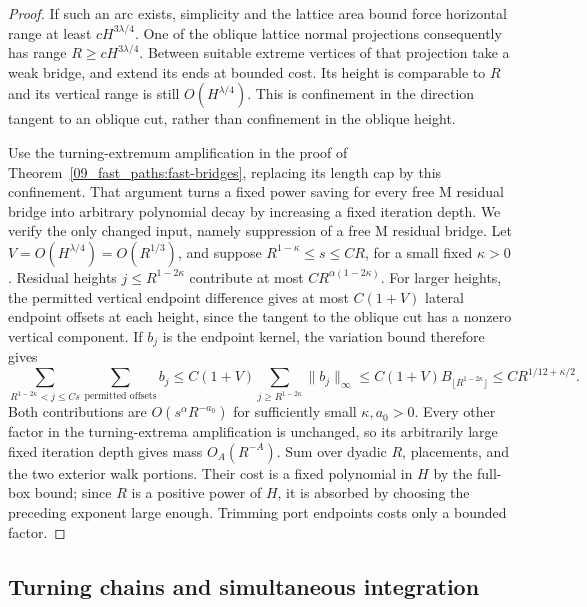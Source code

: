 \begin{proof}
If such an arc exists, simplicity and the lattice area bound force
horizontal range at least $cH^{3\lambda/4}$. One of the oblique lattice
normal projections consequently has range
$R\ge cH^{3\lambda/4}$. Between suitable extreme vertices of that
projection take a weak bridge, and extend its ends at bounded cost.
Its height is comparable to $R$ and its vertical range is still
$O(H^{\lambda/4})$. This is confinement in the direction tangent to
an oblique cut, rather than confinement in the oblique height.

Use the turning-extremum amplification in the proof of
Theorem~\ref{09_fast_paths:fast-bridges}, replacing its length cap
by this confinement. That argument turns a fixed power saving for
every free $\mathrm M$ residual bridge into arbitrary polynomial decay
by increasing a fixed iteration depth. We verify the only changed input, namely suppression of a
free $\mathrm M$ residual bridge. Let $V=O(H^{\lambda/4})=O(R^{1/3})$,
and suppose $R^{1-\kappa}\le s\le CR$, for a small fixed $\kappa>0$.
Residual heights $j\le R^{1-2\kappa}$ contribute at most
$CR^{\alpha(1-2\kappa)}$. For larger heights, the permitted vertical
endpoint difference gives at most $C(1+V)$ lateral endpoint offsets
at each height, since the tangent to the oblique cut has a nonzero
vertical component. If $b_j$ is the endpoint kernel, the variation
bound therefore gives
\[
 \sum_{R^{1-2\kappa}<j\le Cs}
       \sum_{\text{permitted offsets}}b_j
 \le C(1+V)\sum_{j\ge R^{1-2\kappa}}\|b_j\|_\infty
 \le C(1+V)B_{\lfloor R^{1-2\kappa}\rfloor}
 \le C R^{1/12+\kappa/2}.
\]
Both contributions are $O(s^\alpha R^{-a_0})$ for sufficiently small
$\kappa,a_0>0$. Every other factor in the turning-extrema amplification
is unchanged, so its arbitrarily large fixed iteration depth gives
mass $O_A(R^{-A})$. Sum over dyadic $R$, placements, and the two exterior
walk portions. Their cost is a fixed polynomial in $H$ by the full-box
bound; since $R$ is a positive power of $H$, it is absorbed by choosing
the preceding exponent large enough. Trimming port endpoints costs
only a bounded factor.
\end{proof}

\subsection{Turning chains and simultaneous integration}

